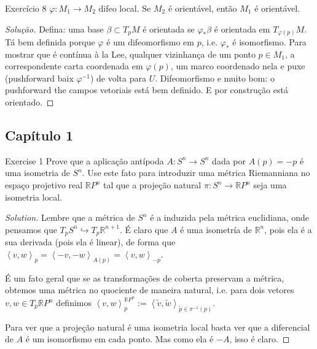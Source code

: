 \begin{thing4}{Exercício 8}\label{exer:8}\leavevmode
\(\varphi:M_1\to M_2\) difeo local. Se \(M_2\) é orientável, então \(M_1\) é orientável.
\end{thing4}
\begin{proof}[Solução]\leavevmode
Defina: uma base \(\beta \subset T_pM\) é orientada se \(\varphi_*\beta\) é orientada em \(T_{\varphi(p)}M\). Tá bem definida porque \(\varphi\) é um difeomorfismo em \(p\), i.e. \(\varphi_*\) é isomorfismo. Para mostrar que é contínua à la Lee, qualquer vizinhança de um ponto \(p \in M_1\), a correspondente carta coordenada em \(\varphi(p)\), um marco coordenado nela e puxe (pushforward baix \(\varphi^{-1}\)) de volta para \(U\). Difeomorfismo e muito bom: o pushforward the campos vetoriais está bem definido. E por construção está orientado.
\end{proof}
\subsection{Capítulo 1}

\begin{thing4}{Exercise 1}\label{exer:1}\leavevmode
Prove que a aplicação antípoda \(A:S^n \to S^n\) dada por \(A(p)=-p\) é uma isometria de \(S^n\). Use este fato para introduzir uma métrica Riemanniana no espaço projetivo real \(\mathbb{R}P^{n}\) tal que a projeção natural \(\pi: S^n \to \mathbb{R}P^{n}\) seja uma isometria local.
\end{thing4}
\begin{proof}[Solution]\leavevmode
	Lembre que a métrica de \(S^n\) é a induzida pela métrica euclidiana, onde pensamos que \(T_pS^n \hookrightarrow T_p\mathbb{R}^{n+1}\). É claro que \(A\) é uma isometría de \(\mathbb{R}^n\), pois ela é a sua derivada (pois ela é linear), de forma que \(\left<v,w\right>_p=\left<-v,-w\right>_{A(p)}=\left<v,w\right>_{-p}\).

	É um fato geral que se as transformações de coberta preservam a métrica, obtemos uma métrica no quociente de maneira natural, i.e. para dois vetores \(v,w\in T_p\mathbb{R}P^n\) definimos \(\left<v,w\right>_p^{\mathbb{R}P^n}:=\left<\tilde{v},\tilde{w}\right>_{\tilde{p} \in \pi^{-1}(p)}\).

Para ver que a projeção natural é uma isometria local basta ver que a diferencial de \(A\) é um isomorfismo em cada ponto. Mas como ela é \(-A\), isso é claro.
\end{proof}

